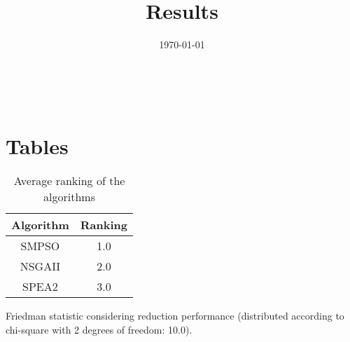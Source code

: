 \documentclass{article}
\title{Results}
\author{}
\date{\today}
\begin{document}
\oddsidemargin 0in \topmargin 0in\maketitle
\
\section{Tables}
\begin{table}[!htp]
\centering
\caption{Average ranking of the algorithms}
\begin{tabular}{c|c}
Algorithm&Ranking\\
\hline
SMPSO&1.0\\
NSGAII&2.0\\
SPEA2&3.0\\
\end{tabular}
\end{table}


Friedman statistic considering reduction performance (distributed according to chi-square with 2 degrees of freedom: 10.0).
\end{document}
